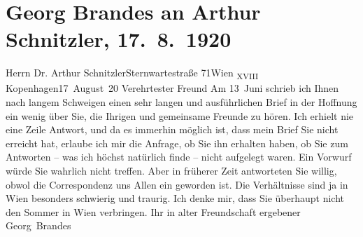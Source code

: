 

         
         \renewcommand{\erwaehntePersonen}{Personen: Georg Brandes}
         \renewcommand{\erwaehnteOrte}{Orte: Kopenhagen, Sternwartestraße, Wien, XVIII., Währing}
         \renewcommand{\erwaehnteWerke}{}
               \section[Georg Brandes an Arthur Schnitzler, 17. 8. 1920]{ Georg Brandes an Arthur Schnitzler, 17. 8. 1920}\nopagebreak{}\rehead{ }\begin{ledgroupsized}[t]{13cm}\normalsize\beginnumbering \toendnotes[C]{\smallbreak\pagebreak[2]} 
\toendnotes[C]{\smallbreak}\pstart{}{\pb}Herrn Dr. Arthur
                  Schnitzler\pend{}\pstart{}Sternwartestraße 71\pend{}\pstart{}Wien \textsubscript{XVIII}\pend{}{\bigskip}\pstart
           \raggedleft{}{\pb}Kopenhagen17 August 20\pend
           \pstart{}Verehrtester Freund\pend\pstart
           Am 13 Juni schrieb ich Ihnen nach langem Schweigen einen sehr langen und
               ausführlichen Brief in der Hoffnung ein wenig über Sie, die Ihrigen und gemeinsame
               Freunde zu hören.\pend
           \pstart
           Ich erhielt nie eine Zeile Antwort, und da es immerhin möglich ist, dass mein Brief
               Sie nicht erreicht hat, erlaube ich mir die Anfrage, ob Sie ihn erhalten haben, ob
               Sie zum Antworten – was ich höchst natürlich finde – nicht aufgelegt waren. Ein
               Vorwurf würde Sie wahrlich nicht treffen. Aber in früherer Zeit antworteten Sie
               willig, obwol {\pb}die Correspondenz
               uns Allen ein \label{K_L02354-1v}\label{K_L02354-1h} geworden
               ist.\pend
           \pstart
           Die Verhältnisse sind ja in Wien besonders
               schwierig und traurig. Ich denke mir, dass Sie überhaupt nicht den Sommer in Wien verbringen.\pend
           \pstart Ihr in alter Freundschaft ergebener \spacefill\mbox{Georg Brandes}\pend{}
         
         \endnumbering{}\end{ledgroupsized}  \newcommand{\dateiname}{L02354}\newcommand{\titel}{Georg Brandes an Arthur Schnitzler, 17. 8. 1920}\newcommand{\editorInnen}{Martin Anton Müller und Gerd-Hermann Susen}
      